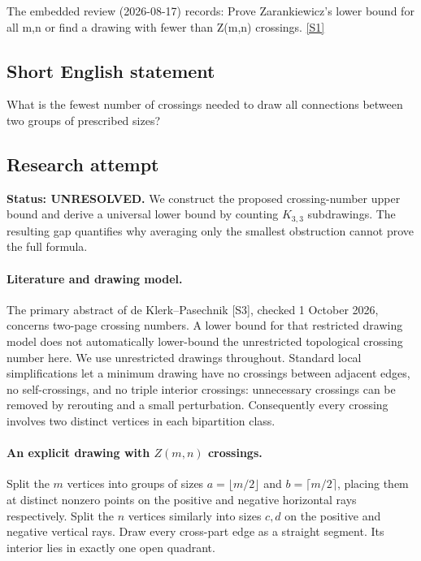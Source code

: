 \documentclass[11pt,a4paper]{article}
\newcommand{\sref}[2]{\hyperlink{source:#1:#2}{[S#2]}}
\begin{document}
The embedded review (2026-08-17) records: Prove Zarankiewicz's lower bound for all m,n or find a drawing with fewer than Z(m,n) crossings. \sref{statement}{1}

\subsection{Short English statement}

What is the fewest number of crossings needed to draw all connections between two groups of prescribed sizes?

\subsection{Research attempt}
\textbf{Status: UNRESOLVED.} We construct the proposed crossing-number upper bound and derive a universal lower bound by counting $K_{3,3}$ subdrawings. The resulting gap quantifies why averaging only the smallest obstruction cannot prove the full formula.

\paragraph{Literature and drawing model.}
The primary abstract of de Klerk--Pasechnik [S3], checked 1 October 2026, concerns two-page crossing numbers. A lower bound for that restricted drawing model does not automatically lower-bound the unrestricted topological crossing number here. We use unrestricted drawings throughout. Standard local simplifications let a minimum drawing have no crossings between adjacent edges, no self-crossings, and no triple interior crossings: unnecessary crossings can be removed by rerouting and a small perturbation. Consequently every crossing involves two distinct vertices in each bipartition class.

\paragraph{An explicit drawing with $Z(m,n)$ crossings.}
Split the $m$ vertices into groups of sizes $a=\lfloor m/2\rfloor$ and $b=\lceil m/2\rceil$, placing them at distinct nonzero points on the positive and negative horizontal rays respectively. Split the $n$ vertices similarly into sizes $c,d$ on the positive and negative vertical rays. Draw every cross-part edge as a straight segment. Its interior lies in exactly one open quadrant.
\end{document}
